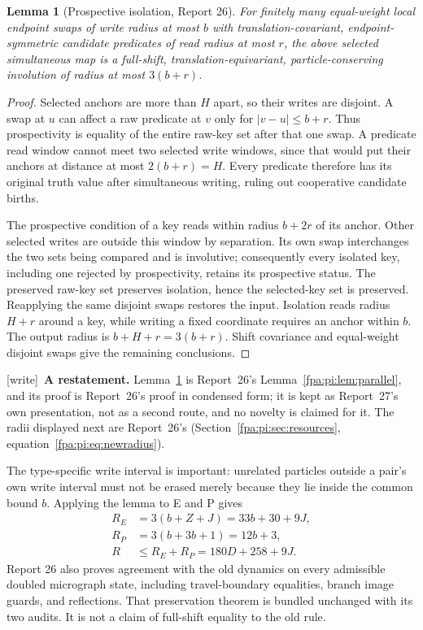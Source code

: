 \documentclass[11pt,a4paper]{article}
\numberwithin{equation}{section}
\newtheorem{lemma}[theorem]{Lemma}
\newcommand{\wtag}{\textup{[write]}}
\begin{document}
\begin{lemma}[Prospective isolation, Report 26]\label{fpa:sp:lem:parallel}
For finitely many equal-weight local endpoint swaps of write radius at most $b$ with translation-covariant, endpoint-symmetric candidate predicates of read radius at most $r$, the above selected simultaneous map is a full-shift, translation-equivariant, particle-conserving involution of radius at most $3(b+r)$.
\end{lemma}
\begin{proof}
Selected anchors are more than $H$ apart, so their writes are disjoint. A swap at $u$ can affect a raw predicate at $v$ only for $|v-u|\le b+r$. Thus prospectivity is equality of the entire raw-key set after that one swap. A predicate read window cannot meet two selected write windows, since that would put their anchors at distance at most $2(b+r)=H$. Every predicate therefore has its original truth value after simultaneous writing, ruling out cooperative candidate births.

The prospective condition of a key reads within radius $b+2r$ of its anchor. Other selected writes are outside this window by separation. Its own swap interchanges the two sets being compared and is involutive; consequently every isolated key, including one rejected by prospectivity, retains its prospective status. The preserved raw-key set preserves isolation, hence the selected-key set is preserved. Reapplying the same disjoint swaps restores the input. Isolation reads radius $H+r$ around a key, while writing a fixed coordinate requires an anchor within $b$. The output radius is $b+H+r=3(b+r)$. Shift covariance and equal-weight disjoint swaps give the remaining conclusions.
\end{proof}

\wtag\ \textbf{A restatement.} Lemma~\ref{fpa:sp:lem:parallel} is Report~26's Lemma~\ref{fpa:pi:lem:parallel}, and its proof is Report~26's proof in condensed form; it is kept as Report~27's own presentation, not as a second route, and no novelty is claimed for it. The radii displayed next are Report~26's (Section~\ref{fpa:pi:sec:resources}, equation~\eqref{fpa:pi:eq:newradius}).

The type-specific write interval is important: unrelated particles outside a pair's own write interval must not be erased merely because they lie inside the common bound $b$. Applying the lemma to E and P gives
\begin{align*}
R_E&=3(b+Z+J)=33b+30+9J,\\
R_P&=3(b+3b+1)=12b+3,\\
R&\le R_E+R_P=180D+258+9J.
\end{align*}
Report 26 also proves agreement with the old dynamics on every admissible doubled micrograph state, including travel-boundary equalities, branch image guards, and reflections. That preservation theorem is bundled unchanged with its two audits. It is not a claim of full-shift equality to the old rule.
\end{document}
